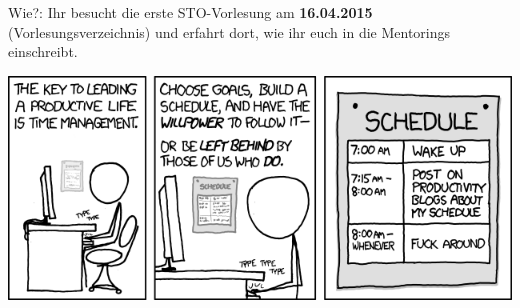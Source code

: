 Wie?: Ihr besucht die erste STO-Vorlesung am \textbf{16.04.2015} (Vorlesungsverzeichnis) und erfahrt dort, wie ihr euch in die Mentorings einschreibt.

 
\begin{center}
	\includegraphics[scale=1.0]{comics/time_management.png}
\end{center}
